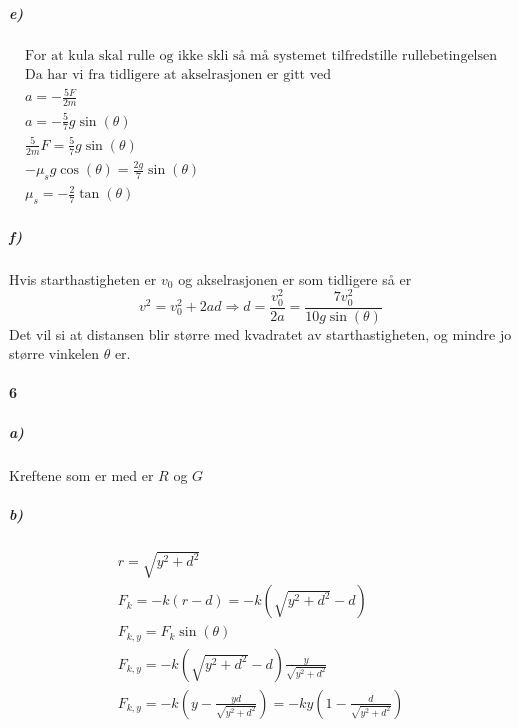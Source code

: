 \documentclass[11pt, A4paper,norsk]{article}
\begin{document}
			\subparagraph{e)}
				\begin{gather*}
\text{For at kula skal rulle og ikke skli så må systemet tilfredstille rullebetingelsen} \\
\text{Da har vi fra tidligere at akselrasjonen er gitt ved} \\
a = - \frac{5F}{2m} \\
a = - \frac{5}{7} g \sin(\theta) \\
\frac{5}{2m} F = \frac{5}{7} g \sin(\theta) \\
- \mu_s g \cos(\theta) = \frac{2g}{7} \sin(\theta) \\
\mu_s = - \frac{2}{7} \tan(\theta)
				\end{gather*}









			\subparagraph{f)}
				\begin{flushleft}
Hvis starthastigheten er $v_0$ og akselrasjonen er som tidligere så er
$$v^2 = v_0^2 + 2 a d \Rightarrow d = \frac{v_0^2}{2 a} = \frac{7 v_0^2}{10 g \sin(\theta)}$$
Det vil si at distansen blir større med kvadratet av starthastigheten, og mindre jo større vinkelen $\theta$ er.
				\end{flushleft}








		\paragraph{6}
			\subparagraph{a)}
				\begin{flushleft}
Kreftene som er med er $R$ og $G$
				\end{flushleft}









			\subparagraph{b)}
				\begin{gather*}
r = \sqrt{y^2 + d^2} \\
F_{k} = - k (r - d) = - k (\sqrt{y^2 + d^2} - d) \\
F_{k,y} = F_k \sin(\theta) \\
F_{k,y} = - k (\sqrt{y^2 + d^2} - d) \frac{y}{\sqrt{y^2 + d^2}} \\
F_{k,y} = - k \left( y - \frac{yd}{\sqrt{y^2 + d^2}} \right) = - ky \left( 1 - \frac{d}{\sqrt{y^2 + d^2}} \right)
				\end{gather*}
\end{document}
